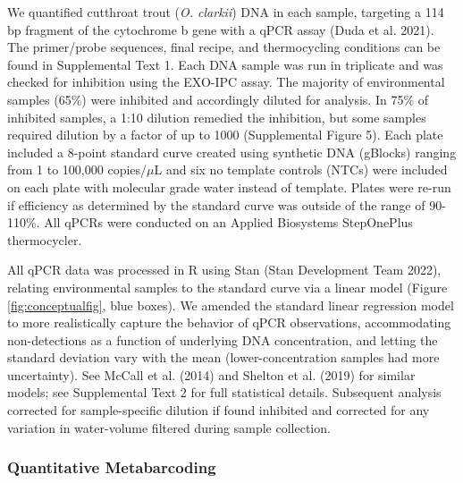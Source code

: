 \documentclass[
]{article}
\begin{document}
We quantified cutthroat trout (\emph{O. clarkii}) DNA in each sample,
targeting a 114 bp fragment of the cytochrome b gene with a qPCR assay
(Duda et al. 2021). The primer/probe sequences, final recipe, and
thermocycling conditions can be found in Supplemental Text 1. Each DNA
sample was run in triplicate and was checked for inhibition using the
EXO-IPC assay. The majority of environmental samples (65\%) were
inhibited and accordingly diluted for analysis. In 75\% of inhibited
samples, a 1:10 dilution remedied the inhibition, but some samples
required dilution by a factor of up to 1000 (Supplemental Figure 5).
Each plate included a 8-point standard curve created using synthetic DNA
(gBlocks) ranging from 1 to 100,000 copies/\(\mu\)L and six no template
controls (NTCs) were included on each plate with molecular grade water
instead of template. Plates were re-run if efficiency as determined by
the standard curve was outside of the range of 90-110\%. All qPCRs were
conducted on an Applied Biosystems StepOnePlus thermocycler.

All qPCR data was processed in R using Stan (Stan Development Team
2022), relating environmental samples to the standard curve via a linear
model (Figure \ref{fig:conceptualfig}, blue boxes). We amended the
standard linear regression model to more realistically capture the
behavior of qPCR observations, accommodating non-detections as a
function of underlying DNA concentration, and letting the standard
deviation vary with the mean (lower-concentration samples had more
uncertainty). See McCall et al. (2014) and Shelton et al. (2019) for
similar models; see Supplemental Text 2 for full statistical details.
Subsequent analysis corrected for sample-specific dilution if found
inhibited and corrected for any variation in water-volume filtered
during sample collection.

\hypertarget{quantitative-metabarcoding}{%
\subsubsection{Quantitative
Metabarcoding}\label{quantitative-metabarcoding}}
\end{document}
